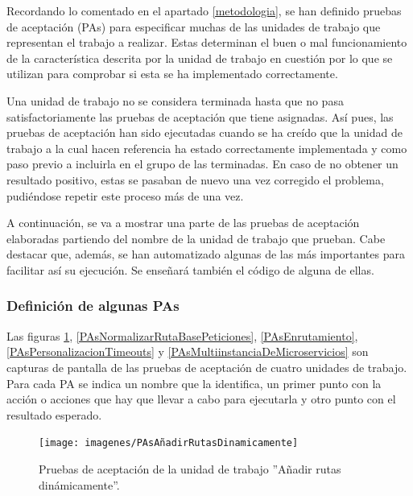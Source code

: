 \documentclass[11pt,spanish,listoffigures]{tfgetsinf}
\begin{document}
Recordando lo comentado en el apartado \ref{metodologia}, se han definido pruebas de aceptación (PAs) para especificar muchas de las unidades de trabajo que representan el trabajo a realizar. Estas determinan el buen o mal funcionamiento de la característica descrita por la unidad de trabajo en cuestión por lo que se utilizan para comprobar si esta se ha implementado correctamente.

Una unidad de trabajo no se considera terminada hasta que no pasa satisfactoriamente las pruebas de aceptación que tiene asignadas. Así pues, las pruebas de aceptación han sido ejecutadas cuando se ha creído que la unidad de trabajo a la cual hacen referencia ha estado correctamente implementada y como paso previo a incluirla en el grupo de las terminadas. En caso de no obtener un resultado positivo, estas se pasaban de nuevo una vez corregido el problema, pudiéndose repetir este proceso más de una vez.

A continuación, se va a mostrar una parte de las pruebas de aceptación elaboradas partiendo del nombre de la unidad de trabajo que prueban. Cabe destacar que, además, se han automatizado algunas de las más importantes para facilitar así su ejecución. Se enseñará también el código de alguna de ellas.


			\subsubsection{Definición de algunas PAs}

Las figuras \ref{PAsAñadirRutasDinamicamente}, \ref{PAsNormalizarRutaBasePeticiones}, \ref{PAsEnrutamiento}, \ref{PAsPersonalizacionTimeouts} y \ref{PAsMultiinstanciaDeMicroservicios} son capturas de pantalla de las pruebas de aceptación de cuatro unidades de trabajo. Para cada PA se indica un nombre que la identifica, un primer punto con la acción o acciones que hay que llevar a cabo para ejecutarla y otro punto con el resultado esperado.

\begin{figure}[ht]
\centering
\texttt{[image: imagenes/PAsAñadirRutasDinamicamente]}
\caption{Pruebas de aceptación de la unidad de trabajo ''Añadir rutas dinámicamente''.}
	\label{PAsAñadirRutasDinamicamente}
\end{figure}
\end{document}
